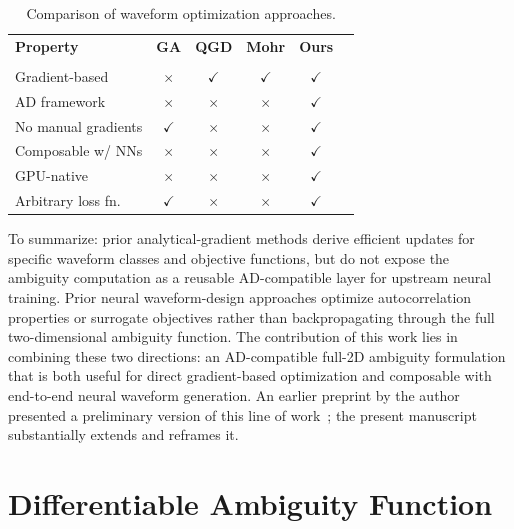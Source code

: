\documentclass[journal]{IEEEtran}
\begin{document}
\begin{table}[!htbp]
\centering
\caption{Comparison of waveform optimization approaches.}
\label{tab:comparison}
\renewcommand{\arraystretch}{1.1}
\begin{tabular}{@{}lccccc@{}}
\toprule
\textbf{Property} & \textbf{GA} & \textbf{QGD} & \textbf{Mohr} & \textbf{Ours} \\
 & & \cite{alhujaili2020quartic} & \cite{mohr2021gradient} & \\
\midrule
Gradient-based         & $\times$ & $\checkmark$ & $\checkmark$ & $\checkmark$ \\
AD framework           & $\times$ & $\times$     & $\times$     & $\checkmark$ \\
No manual gradients    & $\checkmark$ & $\times$ & $\times$     & $\checkmark$ \\
Composable w/ NNs      & $\times$ & $\times$     & $\times$     & $\checkmark$ \\
GPU-native             & $\times$ & $\times$     & $\times$     & $\checkmark$ \\
Arbitrary loss fn.     & $\checkmark$ & $\times$ & $\times$     & $\checkmark$ \\
\bottomrule
\end{tabular}
\end{table}

To summarize: prior analytical-gradient methods derive efficient updates for specific waveform classes and objective functions, but do not expose the ambiguity computation as a reusable AD-compatible layer for upstream neural training.
Prior neural waveform-design approaches optimize autocorrelation properties or surrogate objectives rather than backpropagating through the full two-dimensional ambiguity function.
The contribution of this work lies in combining these two directions: an AD-compatible full-2D ambiguity formulation that is both useful for direct gradient-based optimization and composable with end-to-end neural waveform generation.
An earlier preprint by the author presented a preliminary version of this line of work~\cite{bara2025differentiable}; the present manuscript substantially extends and reframes it.


\section{Differentiable Ambiguity Function}
\label{sec:diffambiguity}
\end{document}
